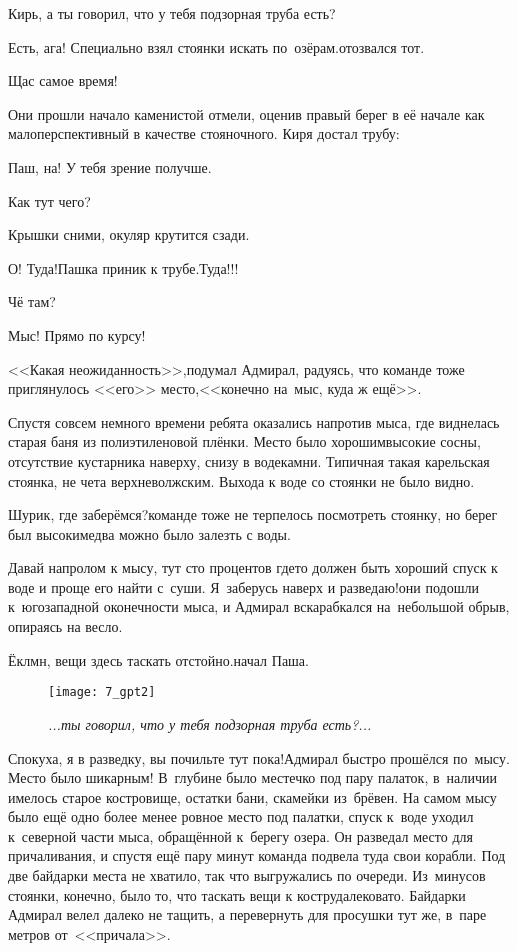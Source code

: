 \diagdash Кирь, а ты говорил, что у тебя подзорная труба есть?

\diagdash Есть, ага! Специально взял стоянки искать по~озёрам.\mdash отозвался тот.  

\diagdash Щас самое время!

Они прошли начало каменистой отмели, оценив правый берег в её начале как малоперспективный в качестве стояночного. Киря достал трубу:

\diagdash Паш, на! У тебя зрение получше.

\diagdash Как тут чего?

\diagdash Крышки сними, окуляр крутится сзади.

\diagdash О! Туда!\mdash Пашка приник к трубе.\mdash Туда!!!

\diagdash Чё там?

\diagdash Мыс! Прямо по курсу!

<<Какая неожиданность>>,\mdash подумал Адмирал, радуясь, что команде тоже приглянулось <<его>> место,\mdash <<конечно на~мыс, куда ж ещё>>.

Спустя совсем немного времени ребята оказались напротив мыса, где виднелась старая баня из полиэтиленовой плёнки. Место было хорошим\mdash высокие сосны, отсутствие кустарника наверху, снизу в воде\mdash камни. Типичная такая карельская стоянка, не чета верхневолжским. Выхода к воде со стоянки не было видно. 

\diagdash Шурик, где заберёмся?\mdash команде тоже не терпелось посмотреть стоянку, но берег был высоким\mdash едва можно было залезть с воды.

\diagdash Давай напролом к мысу, тут сто процентов где\sdash то должен быть хороший спуск к воде и проще его найти с~суши. Я~заберусь наверх и разведаю!\mdash они подошли к~юго\sdash западной оконечности мыса, и Адмирал вскарабкался на~небольшой обрыв, опираясь на весло.

\diagdash Ёклмн, вещи здесь таскать отстойно.\mdash начал Паша. 

\begin{figure}[h]
	\centering
	\texttt{[image: 7\_gpt2]}
	\caption{\small\textit{...ты говорил, что у тебя подзорная труба есть?...}}
\end{figure}

\diagdash Спокуха, я в разведку, вы почильте тут пока!\mdash Адмирал быстро прошёлся по~мысу. Место было шикарным! В~глубине было местечко под пару палаток, в~наличии имелось старое костровище, остатки бани, скамейки из~брёвен. На самом мысу было ещё одно более менее ровное место под палатки, спуск к~воде уходил к~северной части мыса, обращённой к~берегу озера. Он разведал место для причаливания, и спустя ещё пару минут команда подвела туда свои корабли. Под две байдарки места не хватило, так что выгружались по очереди. Из~минусов стоянки, конечно, было то, что таскать вещи к костру\mdash далековато. Байдарки Адмирал велел далеко не тащить, а перевернуть для просушки тут же, в~паре метров от~<<причала>>.

